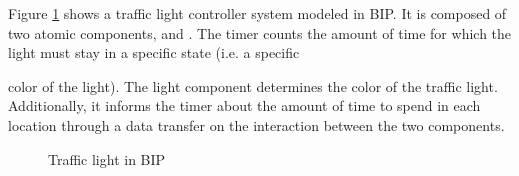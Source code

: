 \begin{example}
Figure \ref{fig:traffic:bip} shows a traffic light controller system modeled in BIP. 
It is composed of two atomic components,  and . The timer counts
the amount of time for which the light must stay in a specific state (i.e. a specific

color of the light). The light component determines the color of the traffic light. Additionally, it
informs the timer about the amount of time to spend in each location through a data transfer on the interaction between the two components. 

\begin{figure}
 \centering
 \resizebox{0.5\textwidth}{!}{
   
 }
 \caption{Traffic light in BIP}
 \label{fig:traffic:bip}
\end{figure}
\end{example}

